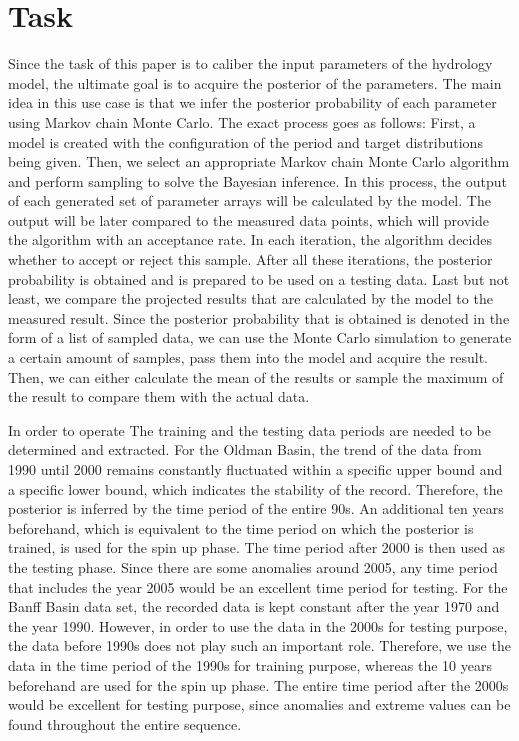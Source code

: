 \section{Task}
Since the task of this paper is to caliber the input parameters of the hydrology model, the ultimate goal is to acquire the posterior of the parameters. The main idea in this use case is that we infer the posterior probability of each parameter using Markov chain Monte Carlo. The exact process goes as follows: First, a model is created with the configuration of the period and target distributions being given. Then, we select an appropriate Markov chain Monte Carlo algorithm and perform sampling to solve the Bayesian inference. In this process, the output of each generated set of parameter arrays will be calculated by the model. The output will be later compared to the measured data points, which will provide the algorithm with an acceptance rate. In each iteration, the algorithm decides whether to accept or reject this sample. After all these iterations, the posterior probability is obtained and is prepared to be used on a testing data. Last but not least, we compare the projected results that are calculated by the model to the measured result. Since the posterior probability that is obtained is denoted in the form of a list of sampled data, we can use the Monte Carlo simulation to generate a certain amount of samples, pass them into the model and acquire the result. Then, we can either calculate the mean of the results or sample the maximum of the result to compare them with the actual data.

In order to operate The training and the testing data periods are needed to be determined and extracted. For the Oldman Basin, the trend of the data from 1990 until 2000 remains constantly fluctuated within a specific upper bound and a specific lower bound, which indicates the stability of the record. Therefore, the posterior is inferred by the time period of the entire 90s. An additional ten years beforehand, which is equivalent to the time period on which the posterior is trained, is used for the spin up phase. The time period after 2000 is then used as the testing phase. Since there are some anomalies around 2005, any time period that includes the year 2005 would be an excellent time period for testing. For the Banff Basin data set, the recorded data is kept constant after the year 1970 and the year 1990. However, in order to use the data in the 2000s for testing purpose, the data before 1990s does not play such an important role. Therefore, we use the data in the time period of the 1990s for training purpose, whereas the 10 years beforehand are used for the spin up phase. The entire time period after the 2000s would be excellent for testing purpose, since anomalies and extreme values can be found throughout the entire sequence.

